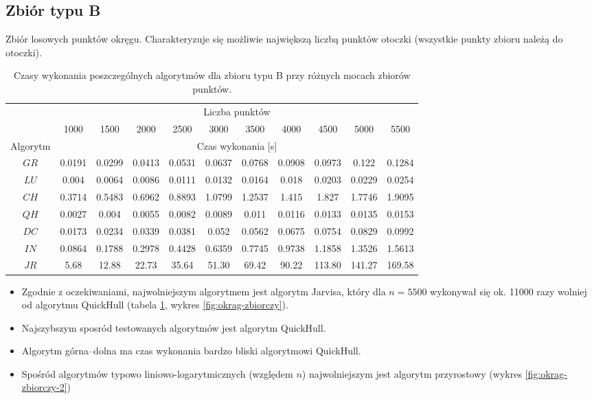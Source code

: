 \documentclass[11pt]{article}
\theoremstyle{remark} \newtheorem{definition}{def.}
\theoremstyle{definition} \newtheorem{twierdzenie}{tw.}
\begin{document}
\subsection{Zbiór typu B}

Zbiór losowych punktów okręgu. Charakteryzuje się możliwie największą liczbą punktów otoczki (wszystkie punkty zbioru należą do otoczki).

\begin{table}[h]
\centering
\caption{Czasy wykonania poszczególnych algorytmów dla zbioru typu B przy różnych mocach zbiorów punktów. }
\label{tab:okrag}
\begin{tabular}{c|c|c|c|c|c|c|c|c|c|c|}
\cline{2-11}
\multicolumn{1}{l|}{} & \multicolumn{10}{c|}{Liczba punktów} \\ \cline{2-11} 
\multicolumn{1}{l|}{} & 1000 & 1500 & 2000 & 2500 & 3000 & 3500 & 4000 & 4500 & 5000 & 5500 \\ \hline
\multicolumn{1}{|c|}{Algorytm} & \multicolumn{10}{c|}{Czas wykonania {[}s{]}} \\ \hline
\multicolumn{1}{|c|}{$GR$} & 0.0191 & 0.0299 & 0.0413 & 0.0531 & 0.0637 & 0.0768 & 0.0908 & 0.0973 & 0.122 & 0.1284 \\ \hline
\multicolumn{1}{|c|}{$LU$} & 0.004 & 0.0064 & 0.0086 & 0.0111 & 0.0132 & 0.0164 & 0.018 & 0.0203 & 0.0229 & 0.0254 \\ \hline
\multicolumn{1}{|c|}{$CH$} & 0.3714 & 0.5483 & 0.6962 & 0.8893 & 1.0799 & 1.2537 & 1.415 & 1.827 & 1.7746 & 1.9095 \\ \hline
\multicolumn{1}{|c|}{$QH$} & 0.0027 & 0.004 & 0.0055 & 0.0082 & 0.0089 & 0.011 & 0.0116 & 0.0133 & 0.0135 & 0.0153 \\ \hline
\multicolumn{1}{|c|}{$DC$} & 0.0173 & 0.0234 & 0.0339 & 0.0381 & 0.052 & 0.0562 & 0.0675 & 0.0754 & 0.0829 & 0.0992 \\ \hline
\multicolumn{1}{|c|}{$IN$} & 0.0864 & 0.1788 & 0.2978 & 0.4428 & 0.6359 & 0.7745 & 0.9738 & 1.1858 & 1.3526 & 1.5613 \\ \hline
\multicolumn{1}{|c|}{$JR$} & 5.68 & 12.88 & 22.73 & 35.64 & 51.30 & 69.42 & 90.22 & 113.80 & 141.27 & 169.58 \\ \hline
\end{tabular}
\end{table}

\begin{itemize}
    \item Zgodnie z oczekiwaniami, najwolniejszym algorytmem jest algorytm Jarvisa, który dla $n = 5500$ wykonywał się ok. 11000 razy wolniej od algorytmu QuickHull (tabela \ref{tab:okrag}, wykres \ref{fig:okrag-zbiorczy}). 
    \item Najszybszym sposród testowanych algorytmów jest algorytm QuickHull. 
    \item Algorytm górna--dolna ma czas wykonania bardzo bliski algorytmowi QuickHull.
    \item Spośród algorytmów typowo liniowo-logarytmicznych (względem $n$) najwolniejszym jest algorytm przyrostowy (wykres \ref{fig:okrag-zbiorczy-2})
\end{itemize}
\end{document}
